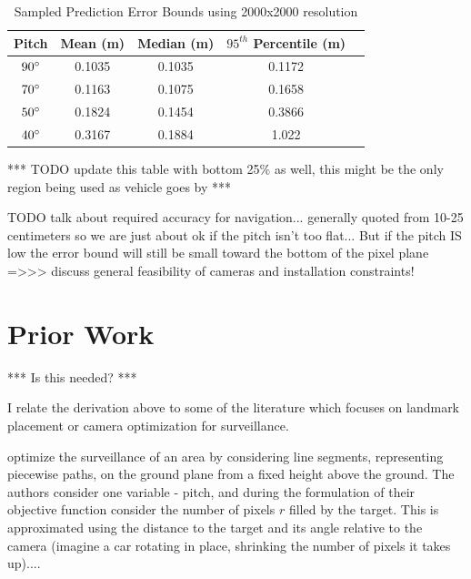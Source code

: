 \documentclass[a4paper,12pt,twoside,openright]{report}
\begin{document}
\begin{table}[htb]
    \centering
    \caption{Sampled Prediction Error Bounds using 2000x2000 resolution}
    \label{tab:camera:best error bounds}
    \begin{tabular}{@{}ccccc@{}}
        \toprule 
        \textbf{Pitch}       & \textbf{Mean (m)}   & \textbf{Median (m)} & \textbf{$95^{th}$ Percentile (m)} &  \\ \midrule 
        $90\degree$ & 0.1035 & 0.1035 & 0.1172           &  \\ 
        $70\degree$ & 0.1163 & 0.1075 & 0.1658           &  \\
        $50\degree$ & 0.1824 & 0.1454 & 0.3866           &  \\
        $40\degree$ & 0.3167 & 0.1884 & 1.022            &  \\ \midrule
    \end{tabular}
\end{table}

*** TODO update this table with bottom 25\% as well, this might be the only region being used as vehicle goes by ***


TODO talk about required accuracy for navigation... generally quoted from 10-25 centimeters
so we are just about ok if the pitch isn't too flat... But if the pitch IS low
the error bound will still be small toward the bottom of the pixel plane
=>>> discuss general feasibility of cameras and installation constraints!



\section{Prior Work}

*** Is this needed? ***

I relate the derivation above to some of the literature which focuses on
landmark placement or camera optimization for surveillance.

\citeauthor{bodor2007optimal} optimize the surveillance of an area by considering
line segments, representing piecewise paths, on the ground plane from a fixed
height above the ground. The authors consider one variable - pitch,
and during the formulation of their
objective function consider the number of pixels $r$ filled by the target.
This is approximated using the distance to the target and its angle relative 
to the camera (imagine a car rotating in place, shrinking the number
of pixels it takes up).... 
\end{document}
